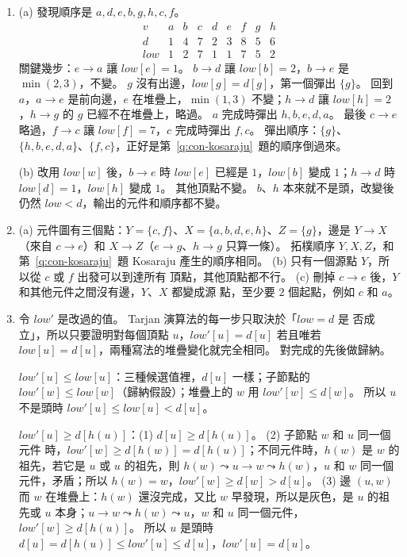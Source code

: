 \begin{enumerate}
\item (a) 發現順序是 $a, d, e, b, g, h, c, f$。
\[
\begin{array}{c|cccccccc}
v & a & b & c & d & e & f & g & h \\
\hline
d & 1 & 4 & 7 & 2 & 3 & 8 & 5 & 6 \\
\mathit{low} & 1 & 2 & 7 & 1 & 1 & 7 & 5 & 2
\end{array}
\]
關鍵幾步：$e \to a$ 讓 $\mathit{low}[e] = 1$。 $b \to d$ 讓 $\mathit{low}[b] = 2$，$b \to e$
是 $\min(2, 3)$，不變。 $g$ 沒有出邊，$\mathit{low}[g] = d[g]$，第一個彈出 $\{g\}$。 回到
$a$，$a \to e$ 是前向邊，$e$ 在堆疊上，$\min(1, 3)$ 不變；$h \to d$ 讓 $\mathit{low}[h]
= 2$，$h \to g$ 的 $g$ 已經不在堆疊上，略過。 $a$ 完成時彈出 $h, b, e, d, a$。 最後 $c \to
e$ 略過，$f \to c$ 讓 $\mathit{low}[f] = 7$，$c$ 完成時彈出 $f, c$。 彈出順序：$\{g\}$、
$\{h, b, e, d, a\}$、$\{f, c\}$，正好是第~\ref{q:con-kosaraju}~題的順序倒過來。

(b) 改用 $\mathit{low}[w]$ 後，$b \to e$ 時 $\mathit{low}[e]$ 已經是 $1$，$\mathit{low}[b]$ 變成
$1$；$h \to d$ 時 $\mathit{low}[d] = 1$，$\mathit{low}[h]$ 變成 $1$。 其他頂點不變。 $b$、$h$
本來就不是頭，改變後仍然 $\mathit{low} < d$，輸出的元件和順序都不變。

\item (a) 元件圖有三個點：$Y = \{c, f\}$、$X = \{a, b, d, e, h\}$、$Z = \{g\}$，邊是 $Y \to
X$（來自 $c \to e$）和 $X \to Z$（$e \to g$、$h \to g$ 只算一條）。 拓樸順序 $Y, X, Z$，和
第~\ref{q:con-kosaraju}~題 Kosaraju 產生的順序相同。 (b) 只有一個源點 $Y$，所以從 $c$ 或 $f$ 出發可以到達所有
頂點，其他頂點都不行。 (c) 刪掉 $c \to e$ 後，$Y$ 和其他元件之間沒有邊，$Y$、$X$ 都變成源
點，至少要 $2$ 個起點，例如 $c$ 和 $a$。

\item 令 $\mathit{low}'$ 是改過的值。 Tarjan 演算法的每一步只取決於「$\mathit{low} = d$ 是
否成立」，所以只要證明對每個頂點 $u$，$\mathit{low}'[u] = d[u]$ 若且唯若 $\mathit{low}[u]
= d[u]$，兩種寫法的堆疊變化就完全相同。 對完成的先後做歸納。

$\mathit{low}'[u] \le \mathit{low}[u]$：三種候選值裡，$d[u]$ 一樣；子節點的
$\mathit{low}'[w] \le \mathit{low}[w]$（歸納假設）；堆疊上的 $w$ 用 $\mathit{low}'[w] \le
d[w]$。 所以 $u$ 不是頭時 $\mathit{low}'[u] \le \mathit{low}[u] < d[u]$。

$\mathit{low}'[u] \ge d[h(u)]$：(1) $d[u] \ge d[h(u)]$。 (2) 子節點 $w$ 和 $u$ 同一個元件
時，$\mathit{low}'[w] \ge d[h(w)] = d[h(u)]$；不同元件時，$h(w)$ 是 $w$ 的祖先，若它是 $u$ 或
$u$ 的祖先，則 $h(w) \leadsto u \to w \leadsto h(w)$，$u$ 和 $w$ 同一個元件，矛盾；所以
$h(w) = w$，$\mathit{low}'[w] \ge d[w] > d[u]$。 (3) 邊 $(u, w)$ 而 $w$ 在堆疊上：$h(w)$
還沒完成，又比 $w$ 早發現，所以是灰色，是 $u$ 的祖先或 $u$ 本身；$u \to w \leadsto h(w)
\leadsto u$，$w$ 和 $u$ 同一個元件，$\mathit{low}'[w] \ge d[h(u)]$。 所以 $u$ 是頭時
$d[u] = d[h(u)] \le \mathit{low}'[u] \le d[u]$，$\mathit{low}'[u] = d[u]$。


\end{enumerate}
